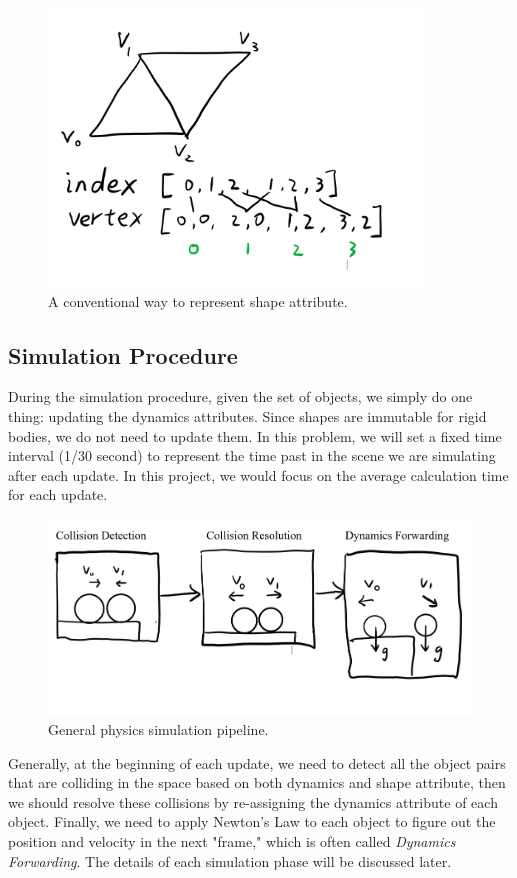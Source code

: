 \documentclass[11pt]{article}
\begin{document}
\begin{figure}[htbp]
\centering
\includegraphics[width=10cm]{./rep_2.png}
\caption{A conventional way to represent shape attribute.}
\end{figure}

\subsection{Simulation Procedure}
\label{sec:orge64320e}
During the simulation procedure, given the set of objects, we simply do one thing: updating the dynamics attributes. Since shapes are immutable for rigid bodies, we do not need to update them. In this problem, we will set a fixed time interval (1/30 second) to represent the time past in the scene we are simulating after each update. In this project, we would focus on the average calculation time for each update.

\begin{figure}[htbp]
\centering
\includegraphics[width=.9\linewidth]{./rep_3.png}
\caption{General physics simulation pipeline.}
\end{figure}

Generally, at the beginning of each update, we need to detect all the object pairs that are colliding in the space based on both dynamics and shape attribute, then we should resolve these collisions by re-assigning the dynamics attribute of each object. Finally, we need to apply Newton's Law to each object to figure out the position and velocity in the next "frame," which is often called \emph{Dynamics Forwarding}. The details of each simulation phase will be discussed later.
\end{document}
